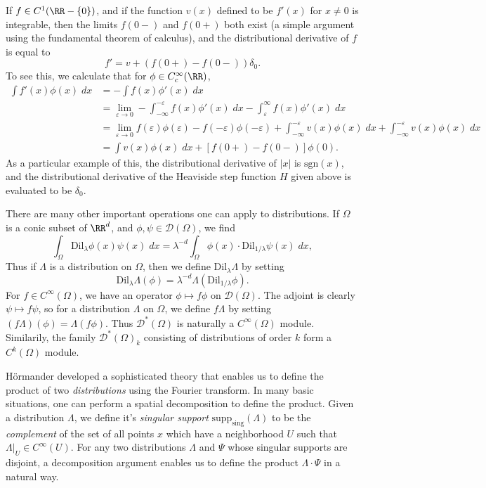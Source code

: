 \begin{example}
    If $f \in C^1(\RR - \{ 0 \})$, and if the function $v(x)$ defined to be $f'(x)$ for $x \neq 0$ is integrable, then the limits $f(0-)$ and $f(0+)$ both exist (a simple argument using the fundamental theorem of calculus), and the distributional derivative of $f$ is equal to
    \[ f' = v + (f(0+) - f(0-)) \delta_0. \]
    To see this, we calculate that for $\phi \in C_c^\infty(\RR)$,
    \begin{align*}
        \int f'(x) \phi(x)\; dx &= -\int f(x) \phi'(x)\; dx\\
        &= \lim_{\varepsilon \to 0} - \int_{-\infty}^{-\varepsilon} f(x) \phi'(x)\; dx - \int_\varepsilon^\infty f(x) \phi'(x)\; dx\\
        &= \lim_{\varepsilon \to 0} f(\varepsilon) \phi(\varepsilon) - f(-\varepsilon) \phi(-\varepsilon) + \int_{-\infty}^{-\varepsilon} v(x) \phi(x)\; dx + \int_{-\infty}^{-\varepsilon} v(x) \phi(x)\; dx\\
        &= \int v(x) \phi(x)\; dx + [f(0+) - f(0-)] \phi(0).
    \end{align*}
    As a particular example of this, the distributional derivative of $|x|$ is $\text{sgn}(x)$, and the distributional derivative of the Heaviside step function $H$ given above is evaluated to be $\delta_0$.
\end{example}

There are many other important operations one can apply to distributions. If $\Omega$ is a conic subset of $\RR^d$, and $\phi,\psi \in \mathcal{D}(\Omega)$, we find
%
\[ \int_{\Omega} \text{Dil}_\lambda \phi(x) \psi(x)\; dx = \lambda^{-d} \int_{\Omega} \phi(x) \cdot \text{Dil}_{1/\lambda} \psi(x)\; dx, \]
%
Thus if $\Lambda$ is a distribution on $\Omega$, then we define $\text{Dil}_\lambda \Lambda$ by setting
%
\[ \text{Dil}_\lambda \Lambda (\phi) = \lambda^{-d} \Lambda( \text{Dil}_{1/\lambda} \phi). \]
%
For $f \in C^\infty(\Omega)$, we have an operator $\phi \mapsto f \phi$ on $\mathcal{D}(\Omega)$. The adjoint is clearly $\psi \mapsto f \psi$, so for a distribution $\Lambda$ on $\Omega$, we define $f \Lambda$ by setting $(f\Lambda)(\phi) = \Lambda(f \phi)$. Thus $\mathcal{D}^*(\Omega)$ is naturally a $C^\infty(\Omega)$ module. Similarily, the family $\mathcal{D}^*(\Omega)_k$ consisting of distributions of order $k$ form a $C^k(\Omega)$ module.

\begin{remark}
    H\"{o}rmander developed a sophisticated theory that enables us to define the product of two \emph{distributions} using the Fourier transform. In many basic situations, one can perform a spatial decomposition to define the product. Given a distribution $\Lambda$, we define it's \emph{singular support} $\text{supp}_{\text{sing}}(\Lambda)$ to be the \emph{complement} of the set of all points $x$ which have a neighborhood $U$ such that $\Lambda|_U \in C^\infty(U)$. For any two distributions $\Lambda$ and $\Psi$ whose singular supports are disjoint, a decomposition argument enables us to define the product $\Lambda \cdot \Psi$ in a natural way.
\end{remark}

